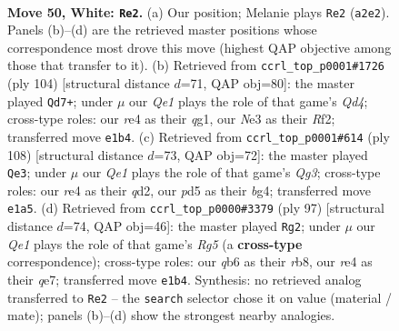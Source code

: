 \documentclass[11pt]{article}
\begin{document}
\clearpage

\begin{figure}[p]\centering
\begin{subfigure}{0.46\textwidth}\centering
\resizebox{\linewidth}{!}{%
\newchessgame
\chessboard[
  setfen={r7/3n3k/1q6/1P1p3p/p3r3/P3N3/R7/3RQ1K1 w - - 6 50},
  showmover=false,
  pgfstyle=straightmove, color=movearrow, markmove={a2-e2}
]}
\caption{}
\end{subfigure}\hfill
\begin{subfigure}{0.46\textwidth}\centering
\resizebox{\linewidth}{!}{%
\newchessgame
\chessboard[
  setfen={8/7k/4P3/1P3pp1/3QP3/P7/2rNKR1p/6q1 w - - 0 53},
  showmover=false,
  pgfstyle=straightmove, color=movearrow, markmove={d4-d7}
]}
\caption{}
\end{subfigure}
\\[4pt]
\begin{subfigure}{0.46\textwidth}\centering
\resizebox{\linewidth}{!}{%
\newchessgame
\chessboard[
  setfen={5rk1/p7/8/P1pPR1p1/2P3b1/6Q1/3q1NK1/8 w - - 0 55},
  showmover=false,
  pgfstyle=straightmove, color=movearrow, markmove={g3-e3}
]}
\caption{}
\end{subfigure}\hfill
\begin{subfigure}{0.46\textwidth}\centering
\resizebox{\linewidth}{!}{%
\newchessgame
\chessboard[
  setfen={1R3nk1/4Q3/3p4/4p2P/6r1/3P1q2/1P3B2/4K3 b - - 22 49},
  showmover=false,
  pgfstyle=straightmove, color=movearrow, markmove={g4-g2}
]}
\caption{}
\end{subfigure}
\caption{\textbf{Move 50, White: \texttt{Re2}.} (a) Our position; Melanie plays \texttt{Re2} (\texttt{a2e2}). Panels (b)--(d) are the retrieved master positions whose correspondence most drove this move (highest QAP objective among those that transfer to it). (b) Retrieved from \texttt{ccrl\_top\_p0001\#1726} (ply 104) [structural distance $d$=71, QAP obj=80]: the master played \texttt{Qd7+}; under $\mu$ our \emph{Qe1} plays the role of that game's \emph{Qd4}; cross-type roles: our \emph{r}e4 as their \emph{q}g1, our \emph{N}e3 as their \emph{R}f2; transferred move \texttt{e1b4}. (c) Retrieved from \texttt{ccrl\_top\_p0001\#614} (ply 108) [structural distance $d$=73, QAP obj=72]: the master played \texttt{Qe3}; under $\mu$ our \emph{Qe1} plays the role of that game's \emph{Qg3}; cross-type roles: our \emph{r}e4 as their \emph{q}d2, our \emph{p}d5 as their \emph{b}g4; transferred move \texttt{e1a5}. (d) Retrieved from \texttt{ccrl\_top\_p0000\#3379} (ply 97) [structural distance $d$=74, QAP obj=46]: the master played \texttt{Rg2}; under $\mu$ our \emph{Qe1} plays the role of that game's \emph{Rg5} (a \textbf{cross-type} correspondence); cross-type roles: our \emph{q}b6 as their \emph{r}b8, our \emph{r}e4 as their \emph{q}e7; transferred move \texttt{e1b4}. Synthesis: no retrieved analog transferred to \texttt{Re2} -- the \texttt{search} selector chose it on value (material / mate); panels (b)--(d) show the strongest nearby analogies.}
\label{fig:thought-m98}
\end{figure}
\end{document}
